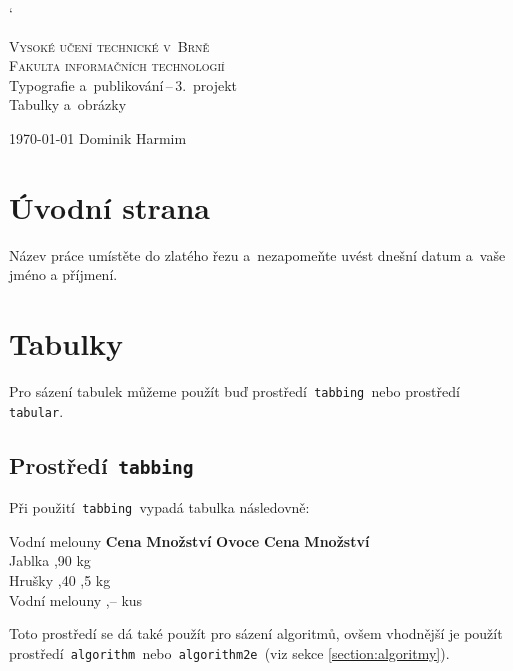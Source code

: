 \documentclass[a4paper, 11pt]{article}
\begin{document}
	\catcode`

	\begin{titlepage}
		\begin{center}
			\Huge
			\textsc{Vysoké učení technické v~Brně} \\
			\huge
			\textsc{Fakulta informačních technologií} \\
			\LARGE
			Typografie a~publikování\,--\,3.~projekt \\
			\Huge
			Tabulky a~obrázky
		\end{center}

		{\Large
			\today
			\hfill
			Dominik Harmim
		}
	\end{titlepage}


	\section{Úvodní strana}

	Název práce umístěte do zlatého řezu a~nezapomeňte uvést dnešní datum a~vaše jméno a příjmení.


	\section{Tabulky}

	Pro sázení tabulek můžeme použít buď prostředí\texttt{ tabbing }nebo prostředí\texttt{ tabular}.


	\subsection{Prostředí\texttt{ tabbing}}

	Při použití\texttt{ tabbing }vypadá tabulka následovně:
	\begin{tabbing}
		Vodní melouny \quad	\= \textbf{Cena} \quad	\= \textbf{Množství}	\kill
		\textbf{Ovoce}		\> \textbf{Cena}		\> \textbf{Množství}	\\
		Jablka				,90				 kg					\\
		Hrušky				,40				,5 kg				\\
		Vodní melouny		,--				 kus				\\
	\end{tabbing}
	Toto prostředí se dá také použít pro sázení algoritmů, ovšem vhodnější je použít
	prostředí\texttt{ algorithm }nebo\texttt{ algorithm2e }(viz sekce \ref{section:algoritmy}).
\end{document}
